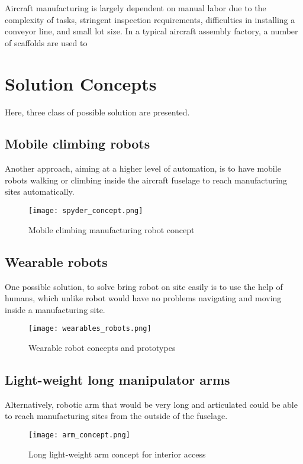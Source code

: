 
Aircraft manufacturing is largely dependent on manual labor due to the complexity of tasks, stringent inspection requirements, difficulties in installing a conveyor line, and small lot size. In a typical
aircraft assembly factory, a number of scaffolds are used to




\section{Solution Concepts}

Here, three class of possible solution are presented.




\subsection{Mobile climbing robots}
\label{sec:MobileClimbingRobots}

Another approach, aiming at a higher level of automation, is to have mobile robots walking or climbing inside the aircraft fuselage to reach manufacturing sites automatically. 


\begin{figure}[H]
	\centering
		\texttt{[image: spyder\_concept.png]}
		\caption{Mobile climbing manufacturing robot concept}
	\label{fig:arm_concept}
\end{figure}


\subsection{Wearable robots}
\label{sec:WearableRobots}

One possible solution, to solve bring robot on site easily is to use the help of humans, which unlike robot would have no problems navigating and moving inside a manufacturing site.

\begin{figure}[H]
	\centering
		\texttt{[image: wearables\_robots.png]}
		\caption{Wearable robot concepts and prototypes}
	\label{fig:wearable_concept}
\end{figure}


\subsection{Light-weight long manipulator arms}
\label{sec:LightWeightLongManipulatorArm}

Alternatively, robotic arm that would be very long and articulated could be able to reach manufacturing sites from the outside of the fuselage. 

\begin{figure}[H]
	\centering
		\texttt{[image: arm\_concept.png]}
		\caption{Long light-weight arm concept for interior access}
	\label{fig:arm_concept}
\end{figure}